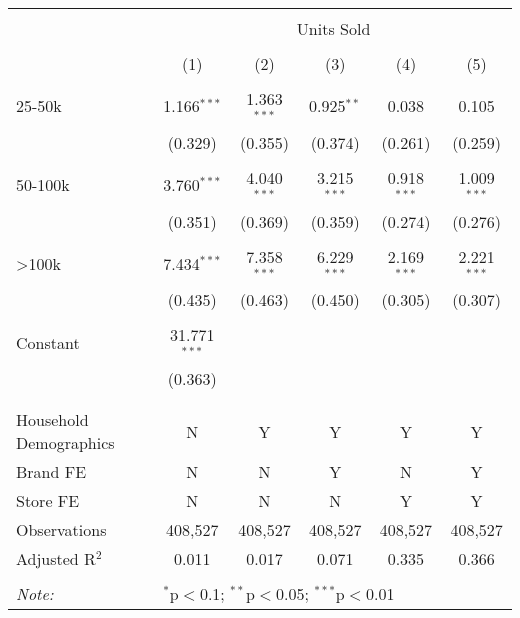 
\begin{table}[!htbp] \centering 
  \caption{} 
  \label{} 
\begin{tabular}{@{\extracolsep{5pt}}lccccc} 
\\[-1.8ex]\hline 
\hline \\[-1.8ex] 
 & \multicolumn{5}{c}{Units Sold} \\ 
\cline{2-6} 
\\[-1.8ex] & (1) & (2) & (3) & (4) & (5)\\ 
\hline \\[-1.8ex] 
 25-50k & 1.166$^{***}$ & 1.363$^{***}$ & 0.925$^{**}$ & 0.038 & 0.105 \\ 
  & (0.329) & (0.355) & (0.374) & (0.261) & (0.259) \\ 
  & & & & & \\ 
 50-100k & 3.760$^{***}$ & 4.040$^{***}$ & 3.215$^{***}$ & 0.918$^{***}$ & 1.009$^{***}$ \\ 
  & (0.351) & (0.369) & (0.359) & (0.274) & (0.276) \\ 
  & & & & & \\ 
 >100k & 7.434$^{***}$ & 7.358$^{***}$ & 6.229$^{***}$ & 2.169$^{***}$ & 2.221$^{***}$ \\ 
  & (0.435) & (0.463) & (0.450) & (0.305) & (0.307) \\ 
  & & & & & \\ 
 Constant & 31.771$^{***}$ &  &  &  &  \\ 
  & (0.363) &  &  &  &  \\ 
  & & & & & \\ 
\hline \\[-1.8ex] 
Household Demographics & N & Y & Y & Y & Y \\ 
Brand FE & N & N & Y & N & Y \\ 
Store FE & N & N & N & Y & Y \\ 
Observations & 408,527 & 408,527 & 408,527 & 408,527 & 408,527 \\ 
Adjusted R$^{2}$ & 0.011 & 0.017 & 0.071 & 0.335 & 0.366 \\ 
\hline 
\hline \\[-1.8ex] 
\textit{Note:}  & \multicolumn{5}{l}{$^{*}$p$<$0.1; $^{**}$p$<$0.05; $^{***}$p$<$0.01} \\ 
\end{tabular} 
\end{table} 
